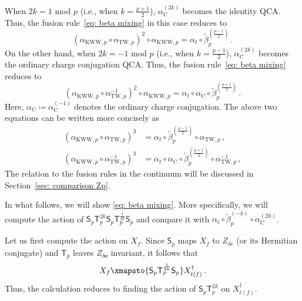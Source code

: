 \documentclass[aps,twocolumn,prx,floatfix,preprintnumbers, nofootinbib,10pt]{revtex4-2}
\numberwithin{equation}{section}
\theoremstyle{definition}
\theoremstyle{remark}
\theoremstyle{claim}
\newcommand{\aKWWp}{\alpha_{\text{KWW},p}}
\newcommand{\aTWp}{\alpha_{\text{TW},p}}
\renewcommand{\sf}[1]{\mathsf{#1}}
\begin{document}
When $2k=1$ mod $p$ (i.e., when $k = \frac{p+1}{2}$), $\alpha_{\text{C}}^{(2k)}$ becomes the identity QCA.
Thus, the fusion rule~\eqref{eq: beta mixing} in this case reduces to
\begin{equation}
(\aKWWp \circ \aTWp)^2 \circ \aKWWp = \alpha_t \circ \tilde{\beta}_p^{\left(\frac{p-1}{2}\right)} \,.
\label{eq: DTDTD minus}
\end{equation}
On the other hand, when $2k=-1$ mod $p$ (i.e., when $k = \frac{p-1}{2}$), $\alpha_{\text{C}}^{(2k)}$ becomes the ordinary charge conjugation QCA.
Thus, the fusion rule~\eqref{eq: beta mixing} reduces to
\begin{equation}
(\aKWWp \circ \aTWp^{-1})^2 \circ \aKWWp = \alpha_t \circ \alpha_\text{C} \circ \tilde{\beta}_p^{\left(\frac{p+1}{2}\right)} \,.
\label{eq: DTDTD plus}
\end{equation}
Here, $\alpha_{\text{C}} \coloneq \alpha_{\text{C}}^{(-1)}$ denotes the ordinary charge conjugation.
The above two equations can be written more concisely as
\begin{align}
 (\aKWWp \circ \aTWp)^3 &= \alpha_t \circ \tilde{\beta}_p^{\left(\frac{p-1}{2}\right)} \circ \aTWp \,, \label{eq: DTDTDT minus} \\
 (\aKWWp \circ \aTWp^{-1})^3 &= \alpha_t \circ \alpha_\text{C} \circ \tilde{\beta}_p^{\left(\frac{p+1}{2}\right)} \circ \aTWp^{-1} \label{eq: DTDTDT plus} \,, 
\end{align}
The relation to the fusion rules in the continuum will be discussed in Section~\ref{sec: comparison Zp}.

In what follows, we will show \eqref{eq: beta mixing}.
More specifically, we will compute the action of $\mathsf{S}_p\mathsf{T}_p^{2k}\mathsf{S}_p\mathsf{T}_p^{\frac{1}{2k}}\mathsf{S}_p$ and compare it with $\alpha_t \circ \tilde{\beta}_p^{(-k)} \circ \alpha_{\text{C}}^{(2k)}$.

Let us first compute the action on $X_f$.
Since $\mathsf{S}_p$ maps $X_f$ to $Z_{\delta e}$ (or its Hermitian conjugate) and $\mathsf{T}_p$ leaves $Z_{\delta \bm{e}}$ invariant, it follows that
\begin{equation}
X_f \xmapsto{\sf{S}_p \sf{T}_p^{\frac{1}{2k}} \sf{S}_p} X_{t(f)}^{\dagger} \,.
\end{equation}
Thus, the calculation reduces to finding the action of $\sf{S}_p \sf{T}_p^{2k}$ on $X_{t(f)}^\dag$.
\end{document}
